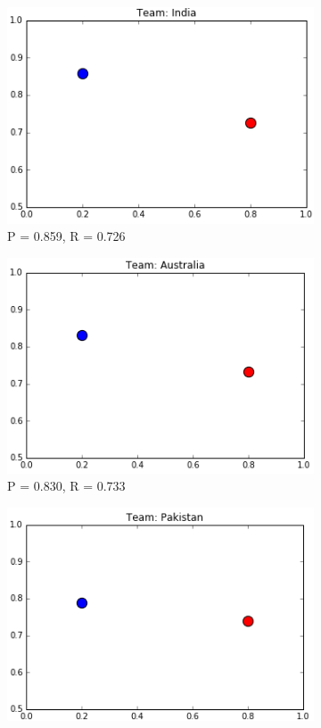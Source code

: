 \documentclass[a4paper, 10pt, conference]{IEEEtran}
\begin{document}
\begin{figure}[h!]
  \centering
  \begin{subfigure}[b]{0.4\linewidth}
    \includegraphics[width=\linewidth]{DTCLF_India.png}
    \caption{P = 0.859, R = 0.726}
  \end{subfigure}
  \begin{subfigure}[b]{0.4\linewidth}
    \includegraphics[width=\linewidth]{DTCLF_Australia.png}
    \caption{P = 0.830, R = 0.733}
  \end{subfigure}
  \begin{subfigure}[b]{0.4\linewidth}
    \includegraphics[width=\linewidth]{DTCLF_Pakistan.png}

\end{subfigure}
\end{figure}
\end{document}

